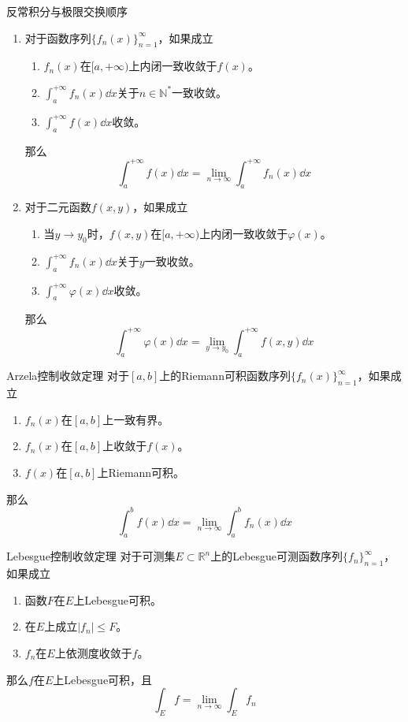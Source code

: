 \documentclass[lang = cn, scheme = chinese, thmcnt = section]{elegantbook}
\newcommand{\N}{\mathbb{N}}            %
\newcommand{\R}{\mathbb{R}}            %
\newcommand{\sub}{\subset}             %
\newcommand{\dis}{\displaystyle}
\begin{document}
\begin{theorem}{反常积分与极限交换顺序}
	\begin{enumerate}
		\item 对于函数序列$\{f_n(x)\}_{n=1}^{\infty}$，如果成立
		\begin{enumerate}
			\item $f_n(x)$在$[a,+\infty)$上内闭一致收敛于$f(x)$。
			\item $\dis \int_{a}^{+\infty}f_n(x)\dd x$关于$n\in\N^*$一致收敛。
			\item $\dis \int_{a}^{+\infty}f(x)\dd x$收敛。
		\end{enumerate}
		那么
		$$
		\int_{a}^{+\infty}f(x)\dd x=\lim_{n\to\infty}\int_{a}^{+\infty}f_n(x)\dd x
		$$
		\item 对于二元函数$f(x,y)$，如果成立
		\begin{enumerate}
			\item 当$y\to y_0$时，$f(x,y)$在$[a,+\infty)$上内闭一致收敛于$\varphi(x)$。
			\item $\dis \int_{a}^{+\infty}f_n(x)\dd x$关于$y$一致收敛。
			\item $\dis \int_{a}^{+\infty}\varphi(x)\dd x$收敛。
		\end{enumerate}
		那么
		$$
		\int_{a}^{+\infty}\varphi(x)\dd x=\lim_{y\to y_0}\int_{a}^{+\infty}f(x,y)\dd x
		$$
	\end{enumerate}
\end{theorem}

\begin{theorem}{Arzela控制收敛定理}
	对于$[a,b]$上的Riemann可积函数序列$\{f_n(x)\}_{n=1}^{\infty}$，如果成立
	\begin{enumerate}
		\item $f_n(x)$在$[a,b]$上一致有界。
		\item $f_n(x)$在$[a,b]$上收敛于$f(x)$。
		\item $f(x)$在$[a,b]$上Riemann可积。
	\end{enumerate}
	那么
	$$
	\int_{a}^{b}f(x)\dd x
	=
	\lim_{n\to\infty}\int_{a}^{b}f_n(x)\dd x
	$$
\end{theorem}

\begin{theorem}{Lebesgue控制收敛定理}
	对于可测集$E\sub\R^n$上的Lebesgue可测函数序列$\{ f_n \}_{n=1}^{\infty}$，如果成立
	\begin{enumerate}
		\item 函数$F$在$E$上Lebesgue可积。
		\item 在$E$上成立$|f_n|\le F$。
		\item $f_n$在$E$上依测度收敛于$f$。
	\end{enumerate}
	那么$f$在$E$上Lebesgue可积，且
	$$
	\int_Ef=\lim_{n\to\infty}\int_Ef_n
	$$
\end{theorem}
\end{document}
